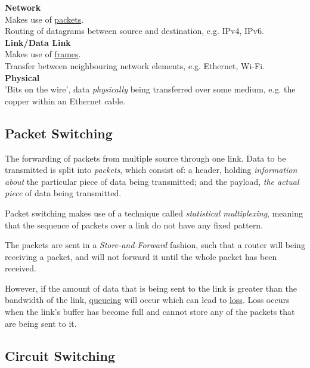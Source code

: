 \documentclass{article}
\begin{document}
{{    \textbf{Network}\\
    
    Makes use of \underline{packets}.\\

    Routing of datagrams between source and destination, e.g. IPv4, IPv6.\\
    
    \textbf{Link/Data Link}\\

    Makes use of \underline{frames}.\\

    Transfer between neighbouring network elements, e.g. Ethernet, Wi-Fi.\\

    \textbf{Physical}\\

    'Bits on the wire', data \textit{physically} being transferred over some medium, e.g. the copper within an Ethernet cable.\\

    }
}

\subsection{Packet Switching}

The forwarding of packets from multiple source through one link. Data to be transmitted is split into \textit{packets}, which consist of: a header, holding \textit{information about} the particular piece of data being transmitted; and the payload, \textit{the actual piece} of data being transmitted.

Packet switching makes use of a technique called \textit{statistical multiplexing}, meaning that the sequence of packets over a link do not have any fixed pattern.

The packets are sent in a \textit{Store-and-Forward} fashion, such that a router will being receiving a packet, and will not forward it until the whole packet has been received. 

However, if the amount of data that is being sent to the link is greater than the bandwidth of the link, \underline{queueing} will occur which can lead to \underline{loss}. Loss occurs when the link's buffer has become full and cannot store any of the packets that are being sent to it.

\subsection{Circuit Switching}
\end{document}
